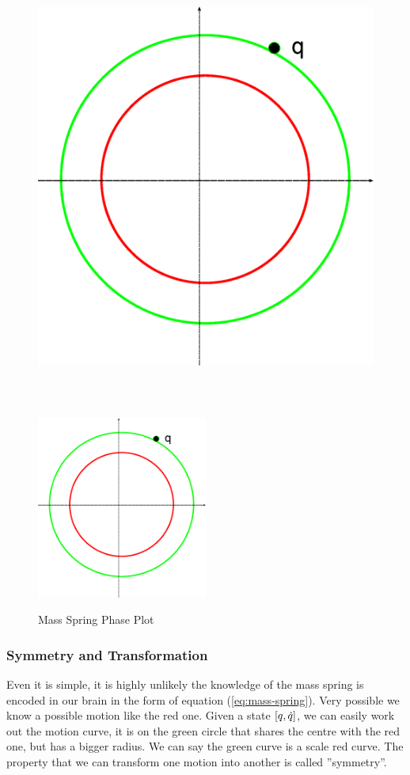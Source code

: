 \begin{figure}[!htbp]
  \begin{center}
    \leavevmode
    \ifpdf
      \includegraphics[height=6in]{MassSpringPhasePlot}
    \else
      \includegraphics[width=0.5\textwidth]{MassSpringPhasePlot}
    \fi
    \caption{Mass Spring Phase Plot}
    \label{fig:massSpringPhasePlot}
  \end{center}
\end{figure}

\subsubsection*{Symmetry and Transformation}
Even it is simple, it is highly unlikely the knowledge of the mass spring is encoded in our brain in the form of equation (\ref{eq:mass-spring}).
Very possible we know a possible motion like the red one.
 Given a state $[q,\dot{q}]$, we can easily work out the motion curve, it is on the green circle that shares the centre with the red one, but has a bigger radius.
 We can say the green curve is a scale red curve.
 The property that we can transform one motion into another is called ''symmetry''.


